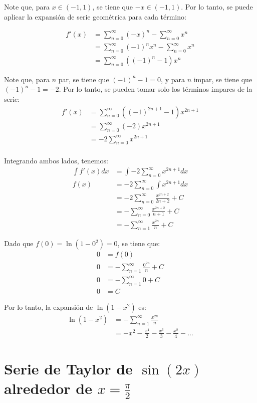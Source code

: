 \documentclass{article}
\begin{document}
Note que, para $x \in (-1, 1)$, se tiene que $-x \in (-1, 1)$. Por lo tanto, se puede aplicar la expansión de serie geométrica para cada término:

\begin{align*}
f'(x) &= \sum_{n=0}^{\infty} (-x)^n - \sum_{n=0}^{\infty} x^n \\
&= \sum_{n=0}^{\infty} (-1)^n x^n - \sum_{n=0}^{\infty} x^n \\
&= \sum_{n=0}^{\infty} \left( (-1)^n - 1 \right) x^n
\end{align*}

Note que, para $n$ par, se tiene que $(-1)^n - 1 = 0$, y para $n$ impar, se tiene que $(-1)^n - 1 = -2$. Por lo tanto, se pueden tomar solo los términos impares de la serie:
\begin{align*}
f'(x) &= \sum_{n=0}^{\infty} \left((-1)^{2n+1} - 1\right) x^{2n+1} \\
&= \sum_{n=0}^{\infty} (-2) x^{2n+1} \\
&= -2 \sum_{n=0}^{\infty} x^{2n+1} \\
\end{align*}

Integrando ambos lados, tenemos:
\begin{align*}
\int f'(x) dx &= \int -2 \sum_{n=0}^{\infty} x^{2n+1} dx \\
f(x) &= -2 \sum_{n=0}^{\infty} \int x^{2n+1} dx \\
&= -2 \sum_{n=0}^{\infty} \frac{x^{2n+2}}{2n+2} + C \\
&= - \sum_{n=0}^{\infty} \frac{x^{2n+2}}{n+1} + C\\
&= - \sum_{n=1}^{\infty} \frac{x^{2n}}{n} + C
\end{align*}

Dado que $f(0) = \ln(1-0^2) = 0$, se tiene que:
\begin{align*}
0 &= f(0) \\
0 &= - \sum_{n=1}^{\infty} \frac{0^{2n}}{n} + C \\
0 &= - \sum_{n=1}^{\infty} 0 + C \\
0 &= C
\end{align*}

Por lo tanto, la expansión de $\ln(1-x^2)$ es:
\begin{align*}
\ln(1-x^2) &= - \sum_{n=1}^{\infty} \frac{x^{2n}}{n} \\
&= -x^2 - \frac{x^4}{2} - \frac{x^6}{3} - \frac{x^8}{4} - \ldots
\end{align*}

\section{Serie de Taylor de $\sin(2x)$ alrededor de $x = \frac{\pi}{2}$}
\end{document}
